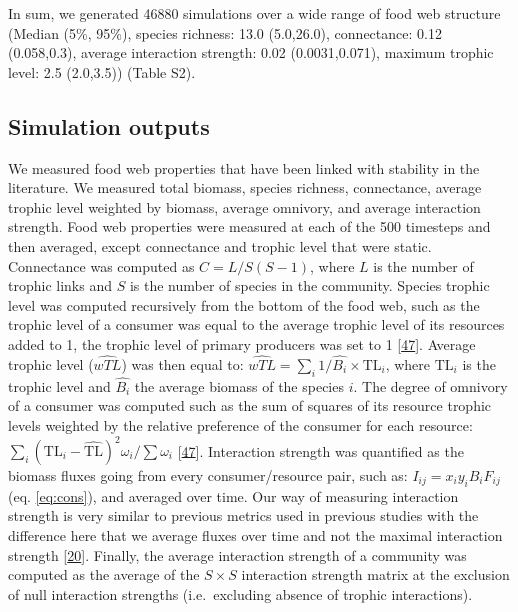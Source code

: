 \documentclass[
]{article}
\begin{document}
In sum, we generated 46880
simulations over a wide range of food web structure (Median (5\%, 95\%),
species richness: 13.0 (5.0,26.0), connectance: 0.12 (0.058,0.3),
average interaction strength: 0.02 (0.0031,0.071), maximum trophic
level: 2.5 (2.0,3.5)) (Table S2).

\hypertarget{simulation-outputs}{%
\subsection{Simulation outputs}\label{simulation-outputs}}

We measured food web properties that have been linked with stability in the
literature. We measured total biomass, species richness, connectance, average
trophic level weighted by biomass, average omnivory, and average interaction
strength. Food web properties were measured at each of the 500 timesteps and
then averaged, except connectance and trophic level that were static.
Connectance was computed as \(C = L / S(S-1)\), where \(L\) is the number of trophic
links and \(S\) is the number of species in the community. Species trophic
level was computed recursively from the bottom of the food web, such as the
trophic level of a consumer was equal to the average trophic level of its
resources added to 1, the trophic level of primary producers was set to 1
{[}\protect\hyperlink{ref-christensen_ecopath_1992}{47}{]}. Average trophic level (\(\hat{wTL}\)) was then equal to:
\(\hat{wTL} = \sum_{i}1/\hat{B_i} \times \mathrm{TL}_i\), where \(\mathrm{TL}_i\) is the trophic level and
\(\hat{B_i}\) the average biomass of the species \(i\). The degree of omnivory of a
consumer was computed such as the sum of squares of its resource trophic levels
weighted by the relative preference of the consumer for each resource: \(\sum_i (\mathrm{TL}_i - \hat{\mathrm{TL}})^2 \omega_i/ \sum \omega_i\)
{[}\protect\hyperlink{ref-christensen_ecopath_1992}{47}{]}. Interaction strength was quantified as
the biomass fluxes going from every consumer/resource pair, such as: \(I_{ij} = x_i y_i B_i F_{ij}\) (eq. \eqref{eq:cons}), and averaged over time. Our way of measuring
interaction strength is very similar to previous metrics used in previous
studies with the difference here that we average fluxes over time and not the
maximal interaction strength {[}\protect\hyperlink{ref-mccann_weak_1998}{20}{]}. Finally, the average
interaction strength of a community was computed as the average of the
\(S \times S\) interaction strength matrix at the exclusion of null interaction
strengths (i.e.~excluding absence of trophic interactions).
\end{document}
